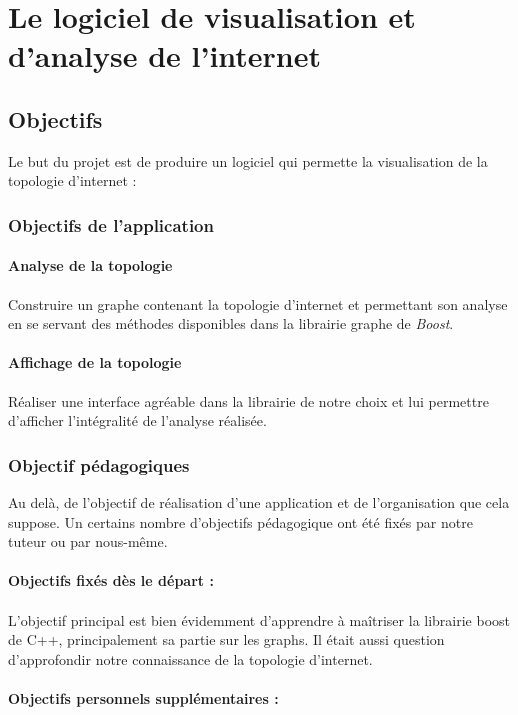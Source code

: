\section{Le logiciel de visualisation et d'analyse de l'internet}
\subsection{Objectifs}
Le but du projet est de produire un logiciel qui permette la visualisation de la topologie d'internet :
\subsubsection{Objectifs de l'application}
\label{obj}
\paragraph{Analyse de la topologie}
Construire un graphe contenant la topologie d'internet et permettant son analyse en se servant des méthodes disponibles dans la librairie graphe de \textit{Boost}.

\paragraph{Affichage de la topologie}
Réaliser une interface agréable dans la librairie de notre choix et lui permettre d'afficher l'intégralité de l'analyse réalisée.

\subsubsection{Objectif pédagogiques}
Au delà, de l'objectif de réalisation d'une application et de l'organisation que cela suppose. Un certains nombre d'objectifs pédagogique ont été fixés par notre tuteur ou par nous-même.

\paragraph{Objectifs fixés dès le départ : } 
\paragraph{}L'objectif principal est bien évidemment d'apprendre à maîtriser la librairie boost de C++, principalement sa partie sur les graphs. Il était aussi question d'approfondir notre connaissance de la topologie d'internet.

\paragraph{Objectifs personnels suppl\'ementaires : }
